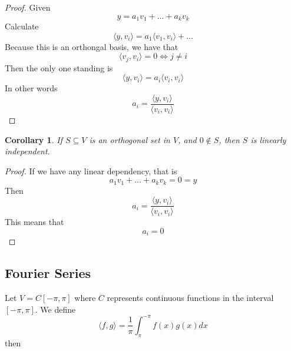 \documentclass{article}
\newtheorem{corollary}[theorem]{Corollary}
\newtheorem{one minute paper}[theorem]{One Minute Paper}
\begin{document}
\begin{proof}
    Given
    \begin{equation}
        y = a_1v_1 + \dots + a_kv_k
    \end{equation}
    Calculate
    \begin{equation}
        \langle y,v_i \rangle = a_1 \langle v_1,v_i\rangle + \dots
    \end{equation}
    Because this is an orthongal basis, we have that 
    \begin{equation}
        \langle v_j, v_i \rangle = 0 \iff j \neq i
    \end{equation}
    Then the only one standing is 
    \begin{equation}
        \langle y,v_i \rangle = a_i \langle v_i, v_i \rangle
    \end{equation}
    In other words 
    \begin{equation}
        a_i = \frac{\langle y, v_i \rangle}{\langle v_i, v_i \rangle}
    \end{equation}
\end{proof}

\begin{corollary}
    If $S \subseteq V$ is an orthogonal set in $V$, and $0 \notin S$, then $S$ is linearly independent. 
\end{corollary}

\begin{proof}
    If we have any linear dependency, that is 
    \begin{equation}
        a_1v_1 + \dots + a_kv_k = 0 = y
    \end{equation}
    Then
    \begin{equation}
        a_i = \frac{\langle y, v_i \rangle }{\langle v_i, v_i \rangle }
    \end{equation}
    This means that 
    \begin{equation}
        a_i = 0
    \end{equation}
\end{proof}

\subsection*{Fourier Series}

Let $V = C[-\pi, \pi]$ where $C$ represents continuous functions in the interval $[-\pi, \pi]$. We define 
\begin{equation}
    \langle f, g \rangle = \frac{1}{\pi}\int_{\pi}^{-\pi}f(x)g(x)dx
\end{equation}then
\end{document}
